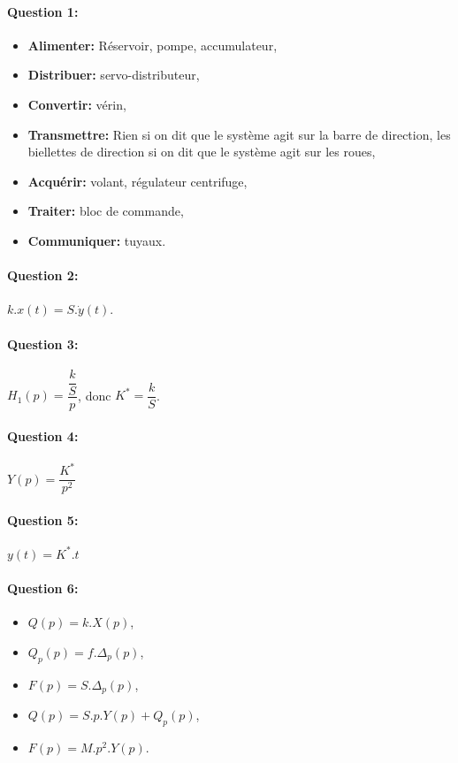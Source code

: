 \paragraph{Question 1:}

\begin{itemize}
 \item \textbf{Alimenter:} Réservoir, pompe, accumulateur,
 \item \textbf{Distribuer:} servo-distributeur,
 \item \textbf{Convertir:} vérin,
 \item \textbf{Transmettre:} Rien si on dit que le système agit sur la barre de direction, les biellettes de direction si on dit que le système agit sur les roues,
 \item \textbf{Acquérir:} volant, régulateur centrifuge,
 \item \textbf{Traiter:} bloc de commande,
 \item \textbf{Communiquer:} tuyaux.
\end{itemize}

\paragraph{Question 2:}

$k.x(t)=S.\dot{y}(t)$.

\paragraph{Question 3:}

$H_1(p)=\dfrac{\dfrac{k}{S}}{p}$, donc $K^*=\dfrac{k}{S}$.

\paragraph{Question 4:}

$Y(p)=\dfrac{K^*}{p^2}$

\paragraph{Question 5:}

$y(t)=K^*.t$

\paragraph{Question 6:}

\begin{itemize}
 \item $Q(p)=k.X(p)$,
 \item $Q_p(p)=f.\Delta_p(p)$,
 \item $F(p)=S.\Delta_p(p)$,
 \item $Q(p)=S.p.Y(p)+Q_p(p)$,
 \item $F(p)=M.p^2.Y(p)$.
\end{itemize}

